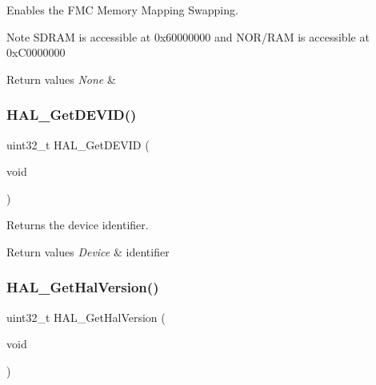 Enables the F\+MC Memory Mapping Swapping. 

\begin{DoxyNote}{Note}
S\+D\+R\+AM is accessible at 0x60000000 and N\+O\+R/\+R\+AM is accessible at 0x\+C0000000
\end{DoxyNote}

\begin{DoxyRetVals}{Return values}
{\em None} & \\
\hline
\end{DoxyRetVals}
\mbox{\label{group___h_a_l___exported___functions___group2_gaff785f069ed650de77ff82ac407f7c84}} 
\subsubsection{\texorpdfstring{HAL\_GetDEVID()}{HAL\_GetDEVID()}}
{\footnotesize\ttfamily uint32\+\_\+t H\+A\+L\+\_\+\+Get\+D\+E\+V\+ID (\begin{DoxyParamCaption}\item[{void}]{ }\end{DoxyParamCaption})}



Returns the device identifier. 


\begin{DoxyRetVals}{Return values}
{\em Device} & identifier \\
\hline
\end{DoxyRetVals}
\mbox{\label{group___h_a_l___exported___functions___group2_gafb139b375512ad2a234e4619b129b966}} 
\subsubsection{\texorpdfstring{HAL\_GetHalVersion()}{HAL\_GetHalVersion()}}
{\footnotesize\ttfamily uint32\+\_\+t H\+A\+L\+\_\+\+Get\+Hal\+Version (\begin{DoxyParamCaption}\item[{void}]{ }\end{DoxyParamCaption})}



